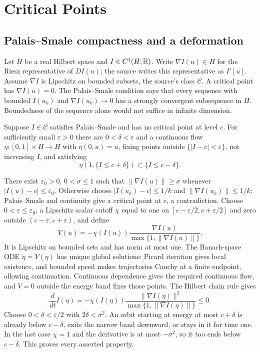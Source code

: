 \Needspace{55mm}
\section{Critical Points}
\label{sec:8-5}
\Needspace{45mm}
\subsection{Palais--Smale compactness and a deformation}
Let $H$ be a real Hilbert space and $I\in C^1(H;\mathbb{R})$.
Write $\nabla I(u)\in H$ for the Riesz representative of $DI(u)$;
the source writes this representative as $I'[u]$.
Assume $\nabla I$ is Lipschitz on bounded subsets, the source's class
$\mathcal C$. A critical point has $\nabla I(u)=0$.
The Palais--Smale condition says that every sequence with bounded
$I(u_k)$ and $\nabla I(u_k)\to0$ has a strongly convergent subsequence in $H$.
Boundedness of the sequence alone would not suffice in infinite dimension.
\Needspace{55mm}
\begin{theorem}
\label{thm:8-deform}
Suppose $I\in\mathcal C$ satisfies Palais--Smale and has no critical point
at level $c$. For sufficiently small $\varepsilon>0$ there are
$0<\delta<\varepsilon$ and a continuous flow
$\eta:[0,1]\times H\to H$ with $\eta(0,u)=u$, fixing points outside
$\{|I-c|<\varepsilon\}$, not increasing $I$, and satisfying
\[
 \eta(1,\{I\leq c+\delta\})\subset\{I\leq c-\delta\}.
\]
\end{theorem}
\begin{expandedproof}
There exist $\varepsilon_0>0$, $0<\sigma\leq1$ such that
$\|\nabla I(u)\|\geq\sigma$ whenever $|I(u)-c|\leq\varepsilon_0$.
Otherwise choose $|I(u_k)-c|\leq1/k$ and $\|\nabla I(u_k)\|\leq1/k$;
Palais--Smale and continuity give a critical point at $c$, a contradiction.
Choose $0<\varepsilon\leq\varepsilon_0$, a Lipschitz scalar cutoff $\chi$
equal to one on $[c-\varepsilon/2,c+\varepsilon/2]$ and zero outside
$(c-\varepsilon,c+\varepsilon)$, and define
\[
 V(u)=-\chi(I(u))\frac{\nabla I(u)}{\max\{1,\|\nabla I(u)\|\}}.
\]
It is Lipschitz on bounded sets and has norm at most one.
The Banach-space ODE $\dot\eta=V(\eta)$ has unique global solutions:
Picard iteration gives local existence, and bounded speed makes trajectories
Cauchy at a finite endpoint, allowing continuation.
Continuous dependence gives the required continuous flow, and $V=0$
outside the energy band fixes those points.
The Hilbert chain rule gives
\[
 \frac d{dt}I(\eta)=-\chi(I(\eta))
 \frac{\|\nabla I(\eta)\|^2}{\max\{1,\|\nabla I(\eta)\|\}}\leq0.
\]
Choose $0<\delta<\varepsilon/2$ with $2\delta<\sigma^2$.
An orbit starting at energy at most $c+\delta$ is already below
$c-\delta$, exits the narrow band downward, or stays in it for time one.
In the last case $\chi=1$ and the derivative is at most $-\sigma^2$,
so it too ends below $c-\delta$. This proves every asserted property.
\end{expandedproof}
\Needspace{55mm}


